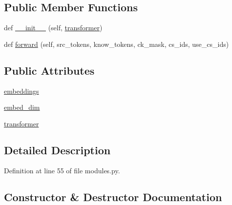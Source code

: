 \subsection*{Public Member Functions}
\begin{DoxyCompactItemize}
\item 
def \hyperlink{classprojects_1_1wizard__of__wikipedia_1_1generator_1_1modules_1_1ContextKnowledgeEncoder_a30bdd85c8d48f70f1c903e0832f618f8}{\+\_\+\+\_\+init\+\_\+\+\_\+} (self, \hyperlink{classprojects_1_1wizard__of__wikipedia_1_1generator_1_1modules_1_1ContextKnowledgeEncoder_aaf8e62c67b68634bd0e3ea1be88b7a6c}{transformer})
\item 
def \hyperlink{classprojects_1_1wizard__of__wikipedia_1_1generator_1_1modules_1_1ContextKnowledgeEncoder_a482a0f0798408978ba2902159517d84b}{forward} (self, src\+\_\+tokens, know\+\_\+tokens, ck\+\_\+mask, cs\+\_\+ids, use\+\_\+cs\+\_\+ids)
\end{DoxyCompactItemize}
\subsection*{Public Attributes}
\begin{DoxyCompactItemize}
\item 
\hyperlink{classprojects_1_1wizard__of__wikipedia_1_1generator_1_1modules_1_1ContextKnowledgeEncoder_aa1c8bdeb31ac36e8ce13856fb6c47006}{embeddings}
\item 
\hyperlink{classprojects_1_1wizard__of__wikipedia_1_1generator_1_1modules_1_1ContextKnowledgeEncoder_af06900dbcf4bcd72ed923dbe8930b0e0}{embed\+\_\+dim}
\item 
\hyperlink{classprojects_1_1wizard__of__wikipedia_1_1generator_1_1modules_1_1ContextKnowledgeEncoder_aaf8e62c67b68634bd0e3ea1be88b7a6c}{transformer}
\end{DoxyCompactItemize}


\subsection{Detailed Description}


Definition at line 55 of file modules.\+py.



\subsection{Constructor \& Destructor Documentation}
\mbox{\label{classprojects_1_1wizard__of__wikipedia_1_1generator_1_1modules_1_1ContextKnowledgeEncoder_a30bdd85c8d48f70f1c903e0832f618f8}} 
